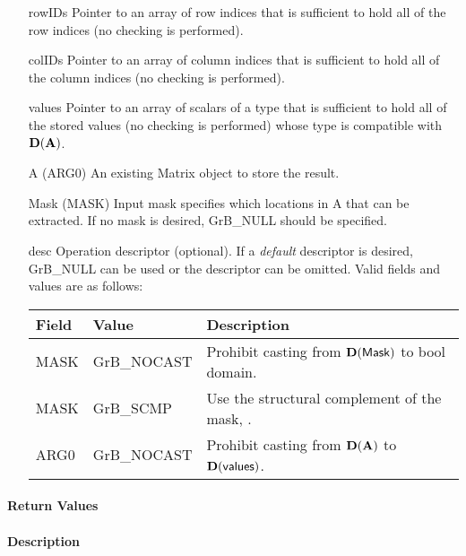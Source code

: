 \begin{itemize}[leftmargin=1.1in]
	\item[{\sf rowIDs}] Pointer to an array of row indices that is sufficient to
                        hold all of the row indices (no checking is performed).
	\item[{\sf colIDs}] Pointer to an array of column indices that is sufficient to
                        hold all of the column indices (no checking is performed). 
	\item[{\sf values}] Pointer to an array of scalars of a type that is sufficient to
                        hold all of the stored values (no checking is performed) whose
                        type is compatible with $\bold{D}({\bf A})$.
    \item[{\sf A}]      ({\sf ARG0}) An existing Matrix object to store the result.
    \item[{\sf Mask}]   ({\sf MASK}) Input mask specifies which locations in
                        {\sf A} that can be extracted.  If no mask is desired,
	                    {\sf GrB\_NULL} should be specified.
	\item[{\sf desc}]   Operation descriptor (optional). If a
	\emph{default} descriptor is desired, {\sf GrB\_NULL} can be
	used or the descriptor can be omitted.  Valid fields and values are as follows: \\
    \begin{tabular}{lll}
    Field  & Value & Description \\
    \hline
    {\sf MASK} & {\sf GrB\_NOCAST} & Prohibit casting from $\bold{D}({\sf Mask})$ to {\sf bool} domain. \\
    {\sf MASK} & {\sf GrB\_SCMP}   & Use the structural complement of the mask, . \\
    {\sf ARG0} & {\sf GrB\_NOCAST} & Prohibit casting from $\bold{D}({\bf A})$ to $\bold{D}({\sf values})$. \\
    \end{tabular}
\end{itemize}

\paragraph{Return Values}
%
\paragraph{Description}
